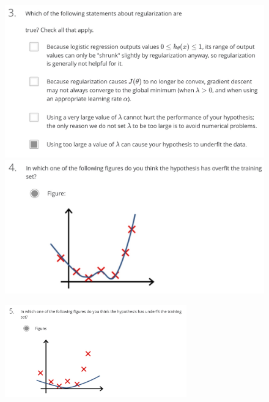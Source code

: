 \documentclass[12pt, A4,onecolumn]{article} %
\begin{document}
\begin{figure}[H]
  \includegraphics[width=\linewidth]{./Imagenes/testFRegul3}
\endminipage\hfill
{}
  \includegraphics[width=\linewidth]{./Imagenes/testFRegul4}
\endminipage\hfill
\end{figure}

\begin{figure}[H]
	\centering
	\includegraphics[width=0.7\textwidth]{./Imagenes/testFRegul5}
\end{figure}
\end{document}
